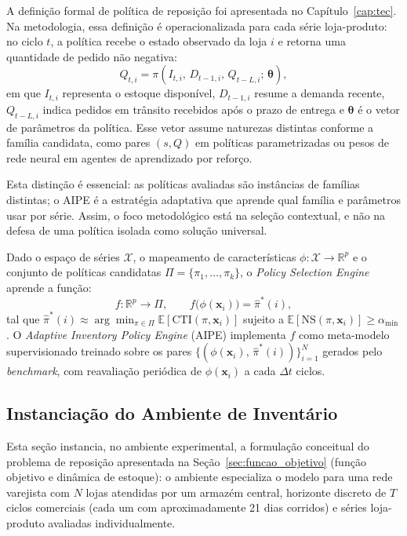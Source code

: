 A definição formal de política de reposição foi apresentada no Capítulo~\ref{cap:tec}. Na metodologia, essa definição é operacionalizada para cada série loja-produto: no ciclo $t$, a política recebe o estado observado da loja $i$ e retorna uma quantidade de pedido não negativa:
\[
  Q_{t,i} = \pi(I_{t,i},\, D_{t-1,i},\, Q_{t-L,i};\, \boldsymbol{\theta}),
\]
em que $I_{t,i}$ representa o estoque disponível, $D_{t-1,i}$ resume a demanda recente, $Q_{t-L,i}$ indica pedidos em trânsito recebidos após o prazo de entrega e $\boldsymbol{\theta}$ é o vetor de parâmetros da política. Esse vetor assume naturezas distintas conforme a família candidata, como pares $(s,Q)$ em políticas parametrizadas ou pesos de rede neural em agentes de aprendizado por reforço.

Esta distinção é essencial: as políticas avaliadas são instâncias de famílias distintas; o AIPE é a estratégia adaptativa que aprende qual família e parâmetros usar por série. Assim, o foco metodológico está na seleção contextual, e não na defesa de uma política isolada como solução universal.

\begin{defi}
Dado o espaço de séries $\mathcal{X}$, o mapeamento de características $\phi: \mathcal{X} \rightarrow \mathbb{R}^p$ e o conjunto de políticas candidatas $\Pi = \{\pi_1, \ldots, \pi_k\}$, o \textit{Policy Selection Engine} aprende a função:
\[
  f: \mathbb{R}^p \rightarrow \Pi, \qquad f\!\bigl(\phi(\mathbf{x}_i)\bigr) = \hat{\pi}^*(i),
\]
tal que $\hat{\pi}^*(i) \approx \arg\min_{\pi \in \Pi} \mathbb{E}[\mathrm{CTI}(\pi, \mathbf{x}_i)]$ sujeito a $\mathbb{E}[\mathrm{NS}(\pi, \mathbf{x}_i)] \geq \alpha_{\min}$. O \textit{Adaptive Inventory Policy Engine} (AIPE) implementa $f$ como meta-modelo supervisionado treinado sobre os pares $\{(\phi(\mathbf{x}_i),\, \hat{\pi}^*(i))\}_{i=1}^N$ gerados pelo \textit{benchmark}, com reavaliação periódica de $\phi(\mathbf{x}_i)$ a cada $\Delta t$ ciclos.
\end{defi}

\subsection{Instanciação do Ambiente de Inventário}
\label{sec:instanciacao_ambiente}

Esta seção instancia, no ambiente experimental, a formulação conceitual do problema de reposição apresentada na Seção~\ref{sec:funcao_objetivo} (função objetivo e dinâmica de estoque): o ambiente especializa o modelo para uma rede varejista com $N$ lojas atendidas por um armazém central, horizonte discreto de $T$ ciclos comerciais (cada um com aproximadamente 21 dias corridos) e séries loja-produto avaliadas individualmente.

